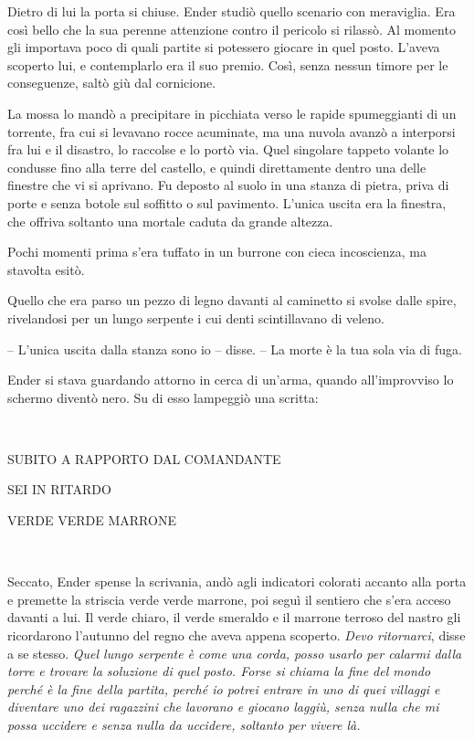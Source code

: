 {Dietro di lui la porta si chiuse. Ender studiò quello scenario con
	meraviglia. Era così bello che la sua perenne attenzione contro il
	pericolo si rilassò. Al momento gli importava poco di quali partite si
	potessero giocare in quel posto. L'aveva scoperto lui, e contemplarlo
	era il suo premio. Così, senza nessun timore per le conseguenze, saltò
	giù dal cornicione.}

{La mossa lo mandò a precipitare in picchiata verso le rapide
	spumeggianti di un torrente, fra cui si levavano rocce acuminate, ma una
	nuvola avanzò a interporsi fra lui e il disastro, lo raccolse e lo portò
	via. Quel singolare tappeto volante lo condusse fino alla terre del
	castello, e quindi direttamente dentro una delle finestre che vi si
	aprivano. Fu deposto al suolo in una stanza di pietra, priva di porte e
	senza botole sul soffitto o sul pavimento. L'unica uscita era la
	finestra, che offriva soltanto una mortale caduta da grande altezza.}

{Pochi momenti prima s'era tuffato in un burrone con cieca incoscienza,
	ma stavolta esitò.}

{Quello che era parso un pezzo di legno davanti al caminetto si svolse
	dalle spire, rivelandosi per un lungo serpente i cui denti scintillavano
	di veleno.}

{-- L'unica uscita dalla stanza sono io -- disse. -- La morte è la tua
	sola via di fuga.}

{Ender si stava guardando attorno in cerca di un'arma, quando
	all'improvviso lo schermo diventò nero. Su di esso lampeggiò una
	scritta:}

{~}

\begin{center}
	{SUBITO A RAPPORTO DAL COMANDANTE}

{SEI IN RITARDO}

{VERDE VERDE MARRONE}
\end{center}

{~}

{Seccato, Ender spense la scrivania, andò agli indicatori colorati
	accanto alla porta e premette la striscia verde verde marrone, poi seguì
	il sentiero che s'era acceso davanti a lui. Il verde chiaro, il verde
	smeraldo e il marrone terroso del nastro gli ricordarono l'autunno del
	regno che aveva appena scoperto. \emph{Devo ritornarci}, \emph{} disse a
	se stesso. \emph{Quel lungo serpente è come una corda, posso usarlo per
		calarmi dalla torre e trovare la soluzione di quel posto. Forse si
		chiama la fine del mondo perché è la fine della partita, perché io
		potrei entrare in uno di quei villaggi e diventare uno dei ragazzini che
		lavorano e giocano laggiù, senza nulla che mi possa uccidere e senza
		nulla da uccidere, soltanto per vivere là.}}

